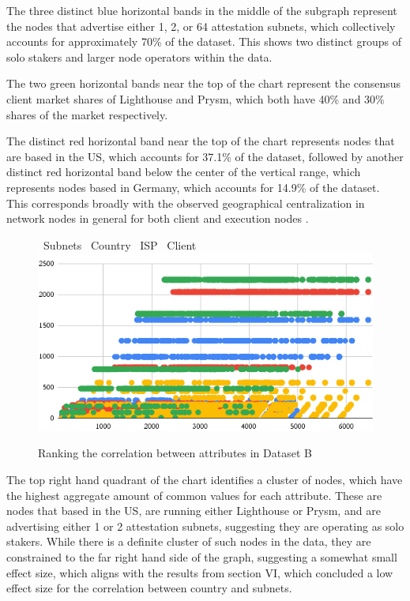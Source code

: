 \documentclass[conference]{IEEEtran}
\begin{document}
The three distinct blue horizontal bands in the middle of the subgraph represent the nodes that advertise either 1, 2, or 64 attestation subnets, which collectively accounts for approximately 70\% of the dataset. This shows two distinct groups of solo stakers and larger node operators within the data.

The two green horizontal bands near the top of the chart represent the consensus client market shares of Lighthouse and Prysm, which both have 40\% and 30\% shares of the market respectively.

The distinct red horizontal band near the top of the chart represents nodes that are based in the US, which accounts for 37.1\% of the dataset, followed by another distinct red horizontal band below the center of the vertical range, which represents nodes based in Germany, which accounts for 14.9\% of the dataset.  This corresponds broadly with the observed geographical centralization in network nodes in general for both client and execution nodes \cite{nodewatch2024}.

\begin{figure}[htbp]
    \centering
    \LARGE \textcolor{bluebullet}\textbullet\ \normalsize Subnets %
    \LARGE \textcolor{redbullet}\textbullet\ \normalsize Country %
    \LARGE \textcolor{yellowbullet}\textbullet\ \normalsize ISP %
    \LARGE \textcolor{greenbullet}\textbullet\ \normalsize Client
    \includegraphics[width=1\linewidth]{figures/chart-7.png}
    \caption{Ranking the correlation between attributes in Dataset B}
    \label{fig:attribute-correlation-ranking-dataset-b}
\end{figure}

The top right hand quadrant of the chart identifies a cluster of nodes, which have the highest aggregate amount of common values for each attribute.  These are nodes that based in the US, are running either Lighthouse or Prysm, and are advertising either 1 or 2 attestation subnets, suggesting they are operating as solo stakers.  While there is a definite cluster of such nodes in the data, they are constrained to the far right hand side of the graph, suggesting a somewhat small effect size, which aligns with the results from section VI, which concluded a low effect size for the correlation between country and subnets.
\end{document}
